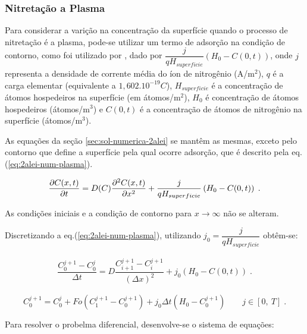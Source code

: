 \subsubsection{Nitretação a Plasma}
\label{sec:nit-plasma}
Para considerar a varição na concentração da superfície quando o processo de nitretação é a plasma, pode-se utilizar um termo de adsorção na condição de contorno, como foi utilizado por \cite{galdikas2011modeling}, dado por $\dfrac{j}{qH_{superficie}}\left(H_0-C(0,t)\right)$, onde $j$ representa a densidade de corrente média do íon de nitrogênio (A/m$^2$), $q$ é a carga elementar (equivalente a $1,602.10^{-19}C$), $H_{superficie}$ é a concentração de átomos hospedeiros na superfície (em átomos/m$^2$), $H_0$ é  concentração de átomos hospedeiros (átomos/m$^3$) e $C(0,t)$ é a concentração de átomos de nitrogênio na superfície (átomos/m$^3$).

As equações da seção \ref{sec:sol-numerica-2alei} se mantêm as mesmas, exceto pelo contorno que define a superfície pela qual ocorre adsorção, que é descrito pela eq.(\ref{eq:2alei-num-plasma}).

\begin{equation}
\label{eq:2alei-num-plasma}
\pdv{C(x,t)}{t} = D(C)\pdv[2]{C(x,t)}{x} + \dfrac{j}{qH_{superficie}}\left(H_0-C(0,t)\right)\;.
\end{equation}

As condições iniciais e a condição de contorno para $x\rightarrow\infty$ não se alteram.

Discretizando a eq.(\ref{eq:2alei-num-plasma}), utilizando $j_0 = \dfrac{j}{qH_{superficie}}$ obtêm-se:

\begin{gather*}
\dfrac{C_0^{j+1} - C_0^j}{\Delta t} = D\dfrac{C_{i+1}^{j+1} - C_{i}^{j+1}}{(\Delta x)^2} + j_0\left(H_0-C(0,t)\right)  \;.
\end{gather*}

\begin{equation}
\label{eq:2alei-num-plasma-discr}
C_0^{j+1} = C_0^j + Fo(C_{1}^{j+1} - C_{0}^{j+1})+ j_0 \Delta t \left(H_0-C_{0}^{j+1}\right)  \qquad   j \in [0,\ T] \;.
\end{equation}

Para resolver o probelma diferencial, desenvolve-se o sistema de equações:

